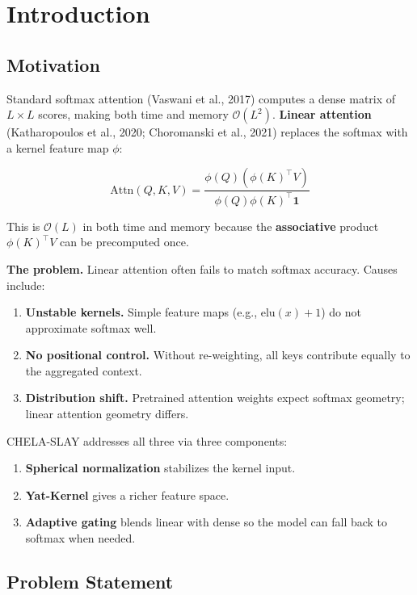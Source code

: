 \section{Introduction}

\subsection{Motivation}

Standard softmax attention (Vaswani et al., 2017) computes a dense matrix 
of $L \times L$ scores, making both time and memory $\mathcal{O}(L^2)$. 
\textbf{Linear attention} (Katharopoulos et al., 2020; Choromanski et al., 2021) 
replaces the softmax with a kernel feature map $\phi$:

\[
\text{Attn}(Q, K, V) = \frac{\phi(Q) (\phi(K)^\top V)}{\phi(Q) \phi(K)^\top \mathbf{1}}
\]

This is $\mathcal{O}(L)$ in both time and memory because the \textbf{associative} 
product $\phi(K)^\top V$ can be precomputed once.

\textbf{The problem.} Linear attention often fails to match softmax accuracy. 
Causes include:

\begin{enumerate}
\item \textbf{Unstable kernels.} Simple feature maps (e.g., $\text{elu}(x) + 1$) do
  not approximate softmax well.
\item \textbf{No positional control.} Without re-weighting, all keys contribute
  equally to the aggregated context.
\item \textbf{Distribution shift.} Pretrained attention weights expect softmax
  geometry; linear attention geometry differs.

\end{enumerate}
CHELA-SLAY addresses all three via three components:

\begin{enumerate}
\item \textbf{Spherical normalization} stabilizes the kernel input.
\item \textbf{Yat-Kernel} gives a richer feature space.
\item \textbf{Adaptive gating} blends linear with dense so the model can fall back
  to softmax when needed.

\end{enumerate}
\subsection{Problem Statement}

